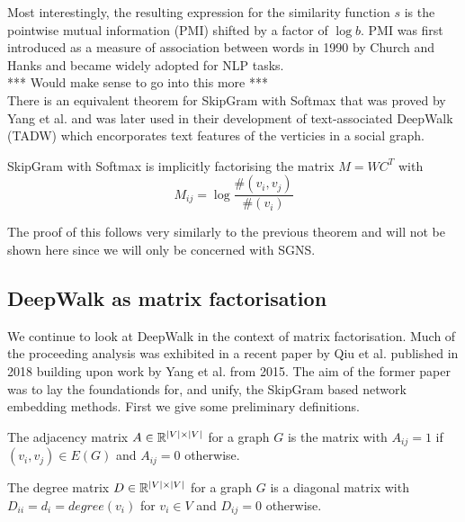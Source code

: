 \documentclass[a4paper]{article}
\begin{document}
Most interestingly, the resulting expression for the similarity function $s$ is
the pointwise mutual information (PMI) shifted by a factor of $\log b$. PMI was
first introduced as a measure of association between words in 1990 by Church and Hanks
\cite{church1990} and became widely adopted for NLP tasks.\\
*** Would make sense to go into this more ***\\
There is an equivalent theorem for SkipGram with Softmax that was proved by Yang
et al.\cite{yangalternative2015} and was later used in their development of
text-associated DeepWalk (TADW)\cite{yang2015} which encorporates text features
of the verticies in a social graph.

\begin{theorem}[Yang et al. (2015)]
  SkipGram with Softmax is implicitly factorising the matrix $M = WC^T$ with
  \[M_{ij} = \log{\frac{\#(v_i,v_j)}{\#(v_i)}}\]
\end{theorem}
The proof of this follows very similarly to the previous theorem and will not be
shown here since we will only be concerned with SGNS.

\subsection{DeepWalk as matrix factorisation}
We continue to look at DeepWalk in the context of matrix factorisation. Much of the proceeding analysis was exhibited in a recent paper by Qiu et
al.\cite{qiu2018} published in 2018 building upon work by Yang et al.\cite{yang2015}
from 2015. The aim of the former paper was to lay the foundationds for, and
unify, the SkipGram based network embedding methods. First we give some preliminary definitions.
\begin{definition}
  The adjacency matrix $A \in \R^{|V| \times |V|}$ for a graph $G$ is the matrix with $A_{ij} = 1$ if $(v_i, v_j) \in E(G)$ and $A_{ij} = 0$ otherwise.
\end{definition}

\begin{definition}
  The degree matrix $D \in \R^{|V| \times |V|}$ for a graph $G$ is a diagonal
  matrix with $D_{ii} = d_i = degree(v_i)$ for $v_i \in V$ and $D_{ij} = 0$ otherwise.
\end{definition}
\end{document}
